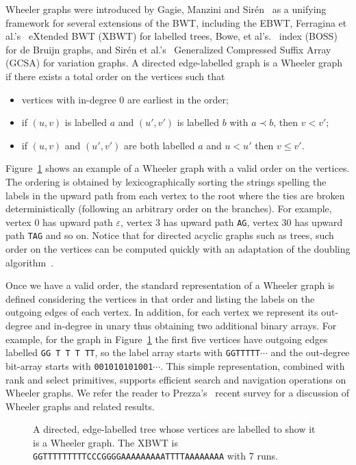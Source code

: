Wheeler graphs were introduced by Gagie, Manzini and Sir\'en~\cite{gagie2017wheeler} as a unifying framework for several extensions of the BWT, including the EBWT, Ferragina et al.'s~\cite{ferragina2009compressing} eXtended BWT (XBWT) for labelled trees, Bowe, et al's.~\cite{BOSS} index (BOSS) for de Bruijn graphs, and Sir\'en et al.'s~\cite{siren2014indexing} Generalized Compressed Suffix Array (GCSA) for variation graphs.  A directed edge-labelled graph is a Wheeler graph if there exists a total order on the vertices such that
\begin{itemize}
\item vertices with in-degree 0 are earliest in the order;
\item if $(u, v)$ is labelled $a$ and $(u', v')$ is labelled $b$ with $a \prec b$, then $v < v'$;
\item if $(u, v)$ and $(u', v')$ are both labelled $a$ and $u < u'$ then $v \leq v'$.
\end{itemize}
Figure~\ref{fig:XBWT} shows an example of a Wheeler graph with a valid order on the vertices.  {The ordering is obtained by lexicographically sorting the strings spelling the labels in the upward path from each vertex to the root where the ties are broken deterministically (following an arbitrary order on the branches). For example, vertex 0 has upward path $\varepsilon$, vertex 3 has upward path {\tt AG}, vertex 30 has upward path {\tt TAG} and so on.} Notice that for directed acyclic graphs such as trees, such order on the vertices can be computed quickly with an adaptation of the doubling algorithm~\cite{doubling_algorithm}.

{Once we have a valid order, the standard representation of a Wheeler graph is defined considering the vertices in that order and listing the labels on the outgoing edges of each vertex. In addition, for each vertex we represent its out-degree and in-degree in unary thus obtaining two additional binary arrays. For example, for the graph in Figure~\ref{fig:XBWT} the first five vertices have outgoing edges labelled \texttt{GG T T T TT}, so the label array starts with {\tt GGTTTTT}$\cdots$ and the out-degree bit-array starts with {\tt 001010101001}$\cdots$. This simple representation, combined with {\sf rank} and {\sf select} primitives, supports efficient search and navigation operations on Wheeler graphs.} We refer the reader to Prezza's~\cite{prezza2021subpath} recent survey for a discussion of Wheeler graphs and related results.

\begin{figure}[t]
\begin{center}
\caption{A directed, edge-labelled tree whose vertices are labelled to show it is a Wheeler graph.  The XBWT is {\tt GGTTTTTTTTTCCCGGGGAAAAAAAAATTTTAAAAAAAA} with 7 runs.}
\label{fig:XBWT}
\end{center}
\end{figure}


